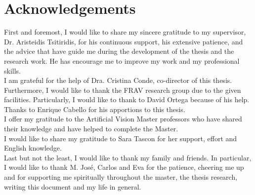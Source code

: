 \chapter*{Acknowledgements} %
First and foremost, I would like to share my sincere gratitude to my supervisor, Dr. Aristeidis Tsitiridis, for his continuous support, his extensive patience, and the advice that have guide me during the development of the thesis and the research work. He has encourage me to improve my work and my professional skills.\\

I am grateful for the help of Dra. Cristina Conde, co-director of this thesis. Furthermore, I would like to thank the FRAV research group due to the given facilities. Particularly, I would like to thank to David Ortega because of his help. Thanks to Enrique Cabello for his apportions to this thesis.\\

I offer my gratitude to the Artificial Vision Master professors who have shared their knowledge and have helped to complete the Master.\\

I would like to share my gratitude to Sara Tascon for her support, effort and English knowledge.\\

Last but not the least, I would like to thank my family and friends. In particular, I would like to thank M. Jos\'e, Carlos and Eva for the patience, cheering me up and for supporting me spiritually throughout the master, the thesis research, writing this document and my life in general.
